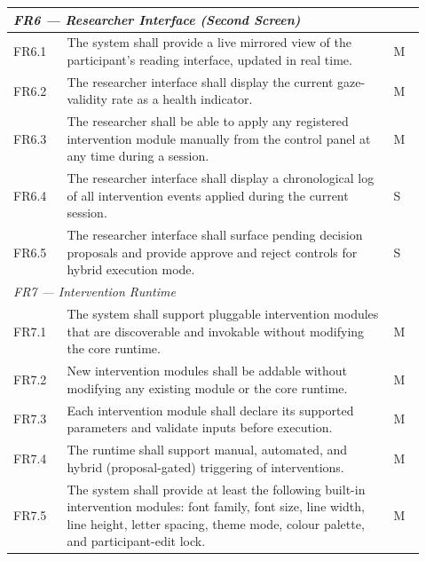 \begin{longtable}{%
  p{0.12\linewidth}
  p{0.73\linewidth}
  p{0.07\linewidth}
}
\multicolumn{3}{l}{\textit{FR6 — Researcher Interface (Second Screen)}} \\
\midrule
FR6.1 & The system shall provide a live mirrored view of the participant's
        reading interface, updated in real time. & M \\
FR6.2 & The researcher interface shall display the current gaze-validity
        rate as a health indicator. & M \\
FR6.3 & The researcher shall be able to apply any registered intervention
        module manually from the control panel at any time during a
        session. & M \\
FR6.4 & The researcher interface shall display a chronological log of all
        intervention events applied during the current session. & S \\
FR6.5 & The researcher interface shall surface pending decision proposals
        and provide approve and reject controls for hybrid execution mode. & S \\
\midrule

\multicolumn{3}{l}{\textit{FR7 — Intervention Runtime}} \\
\midrule
FR7.1 & The system shall support pluggable intervention modules that are
        discoverable and invokable without modifying the core runtime. & M \\
FR7.2 & New intervention modules shall be addable without modifying any
        existing module or the core runtime. & M \\
FR7.3 & Each intervention module shall declare its supported parameters
        and validate inputs before execution. & M \\
FR7.4 & The runtime shall support manual, automated, and hybrid (proposal-gated)
        triggering of interventions. & M \\
FR7.5 & The system shall provide at least the following built-in intervention
        modules: font family, font size, line width, line height, letter spacing,
        theme mode, colour palette, and participant-edit lock. & M \\
\midrule


\end{longtable}
